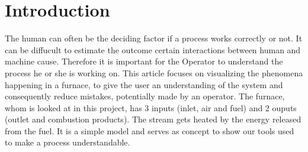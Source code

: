 \section*{Introduction}

The human can often be the deciding factor if a process works correctly or not. It can be diffucult to  estimate the outcome certain interactions between human and machine cause. Therefore it is important for the Operator to understand the process he or she is working on.
\newline
This article focuses on visualizing the phenomena happening in a furnace, to give the user an understanding of the system and consequently reduce mistakes, potentially made by an operator.
\newline
The furnace, whom is looked at in this project, has 3 inputs (inlet, air and fuel) and 2 ouputs (outlet and combustion products). The stream gets heated by the energy released from the fuel. It is a simple model and serves as concept to show our tools used to make a process understandable.
\newline

